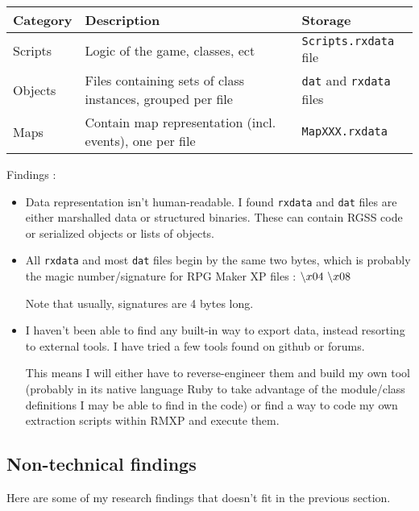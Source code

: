 \documentclass[11pt]{article}
\newcommand\BS{\char`\\}
\begin{document}
\begin{tabular}{|L{.1\textwidth}|L{.52\textwidth}|L{.3\textwidth}|}
	\hline
	\textbf{Category} & \textbf{Description} & \textbf{Storage} \\
	\hline
	Scripts & Logic of the game, classes, ect & \verb|Scripts.rxdata| file \\
	\hline
	Objects & Files containing sets of class instances, grouped per file & \verb|dat| and \verb|rxdata| files \\
	\hline
	Maps & Contain map representation (incl. events), one per file & \verb|MapXXX.rxdata| \\
	\hline
\end{tabular}

Findings :
\begin{itemize}
	\item Data representation isn't human-readable. I found \verb|rxdata| and \verb|dat| files are either marshalled data or structured binaries. These can contain RGSS code or serialized objects or lists of objects.
	
	\item All \verb|rxdata| and most \verb|dat| files begin by the same two bytes, which is probably the magic number/signature for RPG Maker XP files : $\BS x04 \ \BS x08$
	
	Note that usually, signatures are 4 bytes long.
	
	\item I haven't been able to find any built-in way to export data, instead resorting to external tools. I have tried a few tools found on github or forums. %
	
	This means I will either have to reverse-engineer them and build my own tool (probably in its native language Ruby to take advantage of the module/class definitions I may be able to find in the code) or find a way to code my own extraction scripts within RMXP and execute them.
\end{itemize}



\subsection{Non-technical findings}

Here are some of my research findings that doesn't fit in the previous section. 
\end{document}
